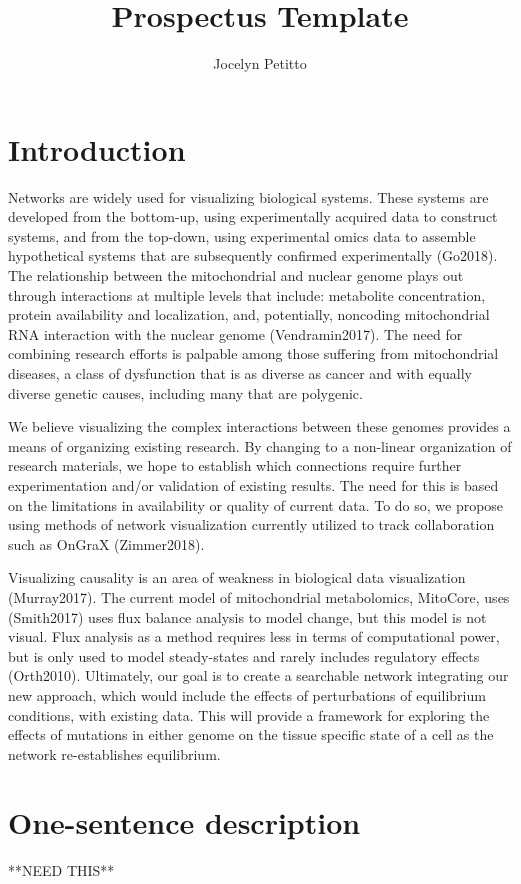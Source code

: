 \documentclass{proc}	%
\title{Prospectus Template}
\author{Jocelyn Petitto}
\begin{document}
\maketitle
\section{Introduction}
Networks are widely used for visualizing biological systems. These systems are developed from the bottom-up, using experimentally acquired data to construct systems, and from the top-down, using experimental omics data to assemble hypothetical systems that are subsequently confirmed experimentally (Go2018). The relationship between the mitochondrial and nuclear genome plays out through interactions at multiple levels that include: metabolite concentration, protein availability and localization, and, potentially, noncoding mitochondrial RNA interaction with the nuclear genome (Vendramin2017).  The need for combining research efforts is palpable among those suffering from mitochondrial diseases, a class of dysfunction that is as diverse as cancer and with equally diverse genetic causes, including many that are polygenic.

We believe visualizing the complex interactions between these genomes provides a means of organizing existing research. By changing to a non-linear organization of research materials, we hope to establish which connections require further experimentation and/or validation of existing results. The need for this is based on the limitations in availability or quality of current data. To do so, we propose using methods of network visualization currently utilized to track collaboration such as OnGraX (Zimmer2018).

Visualizing causality is an area of weakness in biological data visualization (Murray2017). The current model of mitochondrial metabolomics, MitoCore, uses (Smith2017) uses flux balance analysis to model change, but this model is not visual. Flux analysis as a method requires less in terms of computational power, but is only used to model steady-states and rarely includes regulatory effects (Orth2010). Ultimately, our goal is to create a searchable network integrating our new approach, which would include the effects of perturbations of equilibrium conditions, with existing data. This will provide a framework for exploring the effects of mutations in either genome on the tissue specific state of a cell as the network re-establishes equilibrium.

\section{One-sentence description}
**NEED THIS**
\end{document}
